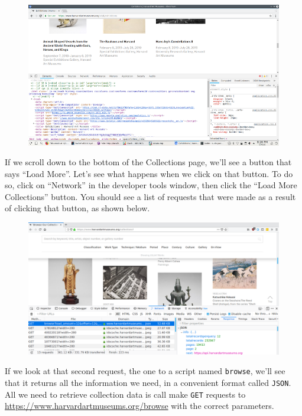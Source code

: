 \documentclass[]{book}
\begin{document}
\begin{figure}
\centering
\includegraphics{Python/PythonWebScrape/images/dev_tools_pane.png}
\caption{}
\end{figure}

If we scroll down to the bottom of the Collections page, we'll see a
button that says ``Load More''. Let's see what happens when we click on
that button. To do so, click on ``Network'' in the developer tools
window, then click the ``Load More Collections'' button. You should see
a list of requests that were made as a result of clicking that button,
as shown below.

\begin{figure}
\centering
\includegraphics{Python/PythonWebScrape/images/dev_tools_network.png}
\caption{}
\end{figure}

If we look at that second request, the one to a script named
\texttt{browse}, we'll see that it returns all the information we need,
in a convenient format called \texttt{JSON}. All we need to retrieve
collection data is call make \texttt{GET} requests to
\url{https://www.harvardartmuseums.org/browse} with the correct
parameters.
\end{document}
